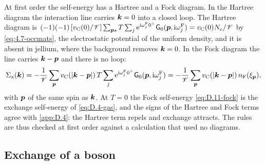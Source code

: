 At first order the self-energy has a Hartree and a Fock diagram. In the Hartree diagram the interaction line carries $\bm{k} = 0$ into a closed loop. The Hartree diagram is $(-1)(-1)\,[v_{\mathrm{C}}(0)/\mathscr{V}]\allowbreak\sum_{\bm{p}s}T\sum_j\mathrm{e}^{\mathrm{i}\omega^{\mathrm{F}}_j0^+}\mathsf{G}_0(\bm{p},\mathrm{i}\omega^{\mathrm{F}}_j) = v_{\mathrm{C}}(0)N_e/\mathscr{V}$ by \cref{eq:4.7-occmats}, the electrostatic potential of the uniform density, and it is absent in jellium, where the background removes $\bm{k} = 0$. In the Fock diagram the line carries $\bm{k} - \bm{p}$ and there is no loop:
\begin{equation}
  \Sigma_{\mathrm{x}}(\bm{k}) = -\frac{1}{\mathscr{V}}\sum_{\bm{p}}v_{\mathrm{C}}(|\bm{k} - \bm{p}|)\,T\sum_j\mathrm{e}^{\mathrm{i}\omega^{\mathrm{F}}_j0^+}\mathsf{G}_0(\bm{p},\mathrm{i}\omega^{\mathrm{F}}_j) = -\frac{1}{\mathscr{V}}\sum_{\bm{p}}v_{\mathrm{C}}(|\bm{k} - \bm{p}|)\,n_{\mathrm{F}}(\xi_{\bm{p}}) ,
  \label{eq:D.11-fock}
\end{equation}
with $\bm{p}$ of the same spin as $\bm{k}$. At $T = 0$ the Fock self-energy \cref{eq:D.11-fock} is the exchange self-energy of \cref{eq:D.4-gas}, and the signs of the Hartree and Fock terms agree with \cref{app:D.4}: the Hartree term repels and exchange attracts. The rules are thus checked at first order against a calculation that used no diagrams.

\subsection*{Exchange of a boson}

